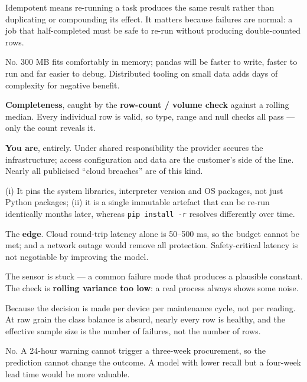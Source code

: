 \begin{ans}
  \item Idempotent means re-running a task produces the same result rather than
        duplicating or compounding its effect. It matters because failures are
        normal: a job that half-completed must be safe to re-run without producing
        double-counted rows.
  \item No. 300 MB fits comfortably in memory; pandas will be faster to write, faster
        to run and far easier to debug. Distributed tooling on small data adds days
        of complexity for negative benefit.
  \item \textbf{Completeness}, caught by the \textbf{row-count / volume check}
        against a rolling median. Every individual row is valid, so type, range and
        null checks all pass --- only the count reveals it.
\end{ans}

\begin{ans}
  \item \textbf{You are}, entirely. Under shared responsibility the provider secures
        the infrastructure; access configuration and data are the customer's side of
        the line. Nearly all publicised ``cloud breaches'' are of this kind.
  \item (i) It pins the system libraries, interpreter version and OS packages, not
        just Python packages; (ii) it is a single immutable artefact that can be
        re-run identically months later, whereas \texttt{pip install -r} resolves
        differently over time.
  \item The \textbf{edge}. Cloud round-trip latency alone is 50--500 ms, so the
        budget cannot be met; and a network outage would remove all protection.
        Safety-critical latency is not negotiable by improving the model.
\end{ans}

\begin{ans}
  \item The sensor is stuck --- a common failure mode that produces a plausible
        constant. The check is \textbf{rolling variance too low}: a real process
        always shows some noise.
  \item Because the decision is made per device per maintenance cycle, not per
        reading. At raw grain the class balance is absurd, nearly every row is
        healthy, and the effective sample size is the number of failures, not the
        number of rows.
  \item No. A 24-hour warning cannot trigger a three-week procurement, so the
        prediction cannot change the outcome. A model with lower recall but a
        four-week lead time would be more valuable.
\end{ans}

